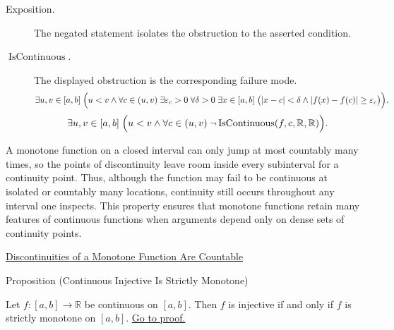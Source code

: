 \begin{remark*}
\begin{description}
  \item[Exposition.]
  The negated statement isolates the obstruction to the asserted condition.

  \item[\(\operatorname{IsContinuous}.\)]
  The displayed obstruction is the corresponding failure mode.
  \[
\exists u,v\in[a,b]\;
\Bigl(u<v \land
\forall c\in(u,v)\;\exists \varepsilon_c>0\;\forall \delta>0\;\exists x\in[a,b]\;
\bigl(|x-c|<\delta\land |f(x)-f(c)|\ge\varepsilon_c\bigr)\Bigr).
  \]
  \[
\exists u,v\in[a,b]\;
\Bigl(u<v \land
\forall c\in(u,v)\;\neg\operatorname{IsContinuous}(f,c,\mathbb{R},\mathbb{R})\Bigr).
  \]
\end{description}
\end{remark*}



\begin{remark*}[Interpretation]
A monotone function on a closed interval can only jump at most countably many times, so the points of discontinuity leave room inside every subinterval for a continuity point. Thus, although the function may fail to be continuous at isolated or countably many locations, continuity still occurs throughout any interval one inspects. This property ensures that monotone functions retain many features of continuous functions when arguments depend only on dense sets of continuity points.
\end{remark*}

\begin{dependencies}
\hyperref[thm:monotone-discontinuities-countable]{Discontinuities of a Monotone Function Are Countable}
\end{dependencies}

\begin{propositionbox}{Proposition (Continuous Injective Is Strictly Monotone)}
\begin{proposition}
\label{prop:continuous-injective-iff-strictly-monotone}
Let $f:[a,b]\to\mathbb{R}$ be continuous on $[a,b]$. Then $f$ is injective if and only if $f$ is strictly monotone on $[a,b]$.
\hyperref[prf:continuous-injective-iff-strictly-monotone]{Go to proof.}
\end{proposition}
\end{propositionbox}

